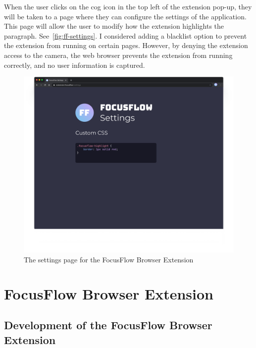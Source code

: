 \documentclass{report}
\begin{document}
When the user clicks on the cog icon in the top left of the extension pop-up, they will be taken to a page where they can configure the settings of the application. This page will allow the user to modify how the extension highlights the paragraph. See~\autoref{fig:ff-settings}. I considered adding a blacklist option to prevent the extension from running on certain pages. However, by denying the extension access to the camera, the web browser prevents the extension from running correctly, and no user information is captured. 

\begin{figure}
    \centering
    \includegraphics[scale=0.25]{../assets/focusflow-settings-page.png}
    \caption{The settings page for the FocusFlow Browser Extension}
    \label{fig:ff-settings}
\end{figure}


\chapter{FocusFlow Browser Extension}
\label{chap:methods}


\section{Development of the FocusFlow Browser Extension}
\end{document}

